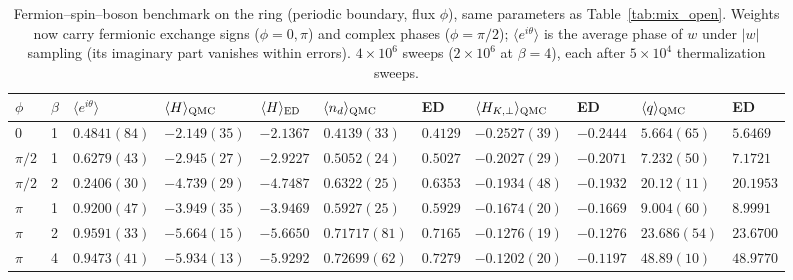 \begin{table}[t]
\caption{Fermion--spin--boson benchmark on the ring (periodic boundary, flux $\phi$), same parameters as Table~\ref{tab:mix_open}. Weights now carry fermionic exchange signs ($\phi=0,\pi$) and complex phases ($\phi=\pi/2$); $\langle e^{i\theta}\rangle$ is the average phase of $w$ under $|w|$ sampling (its imaginary part vanishes within errors). $4\times10^6$ sweeps ($2\times10^6$ at $\beta=4$), each after $5\times10^4$ thermalization sweeps.}
\label{tab:mix_ring}
\small
\begin{tabular}{ll|l|ll|ll|ll|ll}
\hline\hline
$\phi$ & $\beta$ & $\langle e^{i\theta}\rangle$ & $\langle H\rangle_{\rm QMC}$ & $\langle H\rangle_{\rm ED}$ & $\langle n_d\rangle_{\rm QMC}$ & ED & $\langle H_{K,\perp}\rangle_{\rm QMC}$ & ED & $\langle q\rangle_{\rm QMC}$ & ED\\
\hline
$0$ & 1 & $0.4841(84)$ & $-2.149(35)$ & $-2.1367$ & $0.4139(33)$ & $0.4129$ & $-0.2527(39)$ & $-0.2444$ & $5.664(65)$ & $5.6469$ \\
$\pi/2$ & 1 & $0.6279(43)$ & $-2.945(27)$ & $-2.9227$ & $0.5052(24)$ & $0.5027$ & $-0.2027(29)$ & $-0.2071$ & $7.232(50)$ & $7.1721$ \\
$\pi/2$ & 2 & $0.2406(30)$ & $-4.739(29)$ & $-4.7487$ & $0.6322(25)$ & $0.6353$ & $-0.1934(48)$ & $-0.1932$ & $20.12(11)$ & $20.1953$ \\
$\pi$ & 1 & $0.9200(47)$ & $-3.949(35)$ & $-3.9469$ & $0.5927(25)$ & $0.5929$ & $-0.1674(20)$ & $-0.1669$ & $9.004(60)$ & $8.9991$ \\
$\pi$ & 2 & $0.9591(33)$ & $-5.664(15)$ & $-5.6650$ & $0.71717(81)$ & $0.7165$ & $-0.1276(19)$ & $-0.1276$ & $23.686(54)$ & $23.6700$ \\
$\pi$ & 4 & $0.9473(41)$ & $-5.934(13)$ & $-5.9292$ & $0.72699(62)$ & $0.7279$ & $-0.1202(20)$ & $-0.1197$ & $48.89(10)$ & $48.9770$ \\
\hline\hline
\end{tabular}
\end{table}
